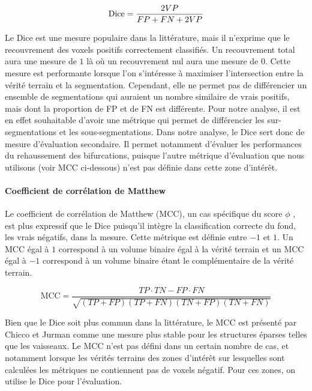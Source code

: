 \begin{equation}
  \textrm{Dice} = \frac{2 VP}{FP + FN + 2 VP} \\ 
  \label{eq:Dice}
\end{equation}

Le Dice est une mesure populaire dans la littérature, mais il n'exprime que le recouvrement des voxels positifs correctement classifiés. Un recouvrement total aura une mesure de $1$ là où un recouvrement nul aura une mesure de $0$. Cette mesure est performante lorsque l'on s'intéresse à maximiser l'intersection entre la vérité terrain et la segmentation. Cependant, elle ne permet pas de différencier un ensemble de segmentations qui auraient un nombre similaire de vrais positifs, mais dont la proportion de FP et de FN est différente. Pour notre analyse, il est en effet souhaitable d'avoir une métrique qui permet de différencier les sur-segmentations et les sous-segmentations. Dans notre analyse, le Dice sert donc de mesure d'évaluation secondaire. Il permet notamment d'évaluer les performances du rehaussement des bifurcations, puisque l'autre métrique d'évaluation que nous utilisons (voir MCC ci-dessous) n'est pas définie dans cette zone d'intérêt.

\paragraph{Coefficient de corrélation de Matthew}

Le coefficient de corrélation de Matthew (MCC), un cas spécifique du score $\phi$ \cite{Chicco2020_advantages_MCC_Dice}, est plus  expressif que le Dice puisqu'il intègre la classification correcte du fond, les vrais négatifs, dans la mesure. Cette métrique est définie entre $-1$ et $1$. Un MCC égal à $1$ correspond à un volume binaire égal à la vérité terrain et un MCC égal à $-1$ correspond à un volume binaire étant le complémentaire de la vérité terrain.

\begin{equation}
  \textrm{MCC} = \frac{TP \cdot TN - FP \cdot FN}{\sqrt{(TP+FP)(TP+FN)(TN+FP)(TN+FN)}}
  \label{eq:MCC}
\end{equation}

Bien que le Dice soit plus commun dans la littérature, le MCC est présenté par Chicco et Jurman \cite{Chicco2020_advantages_MCC_Dice} comme une mesure plus stable pour les structures éparses telles que les vaisseaux. Le MCC n'est pas défini dans un certain nombre de cas, et notamment lorsque les vérités terrains des zones d'intérêt sur lesquelles sont calculées les métriques ne contiennent pas de voxels négatif. Pour ces zones, on utilise le Dice pour l'évaluation. 

